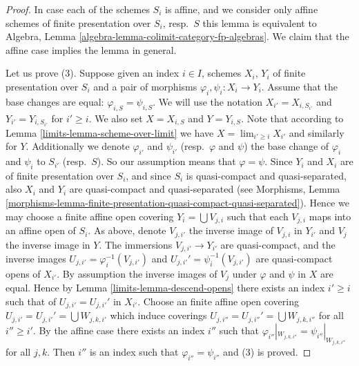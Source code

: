 \begin{proof}

In case each of the schemes $S_i$ is affine, and we consider
only affine schemes of finite presentation over $S_i$, resp.\ $S$
this lemma is equivalent to
Algebra, Lemma \ref{algebra-lemma-colimit-category-fp-algebras}.
We claim that the affine case implies the lemma in general.

\medskip\noindent
Let us prove (3). Suppose given an index $i \in I$, schemes
$X_i$, $Y_i$ of finite presentation over $S_i$ and a pair of morphisms
$\varphi_i, \psi_i : X_i \to Y_i$. Assume that the base changes are
equal: $\varphi_{i, S} = \psi_{i, S}$. We will use the notation
$X_{i'} = X_{i, S_{i'}}$ and $Y_{i'} = Y_{i, S_{i'}}$ for
$i' \geq i$. We also set $X = X_{i, S}$ and $Y = Y_{i, S}$.
Note that according to Lemma \ref{limits-lemma-scheme-over-limit} we have
$X = \lim_{i' \geq i} X_{i'}$ and similarly for $Y$.
Additionally we denote $\varphi_{i'}$ and $\psi_{i'}$
(resp.\ $\varphi$ and $\psi$)
the base change of $\varphi_i$ and $\psi_i$ to $S_{i'}$
(resp.\ $S$). So our assumption means that $\varphi = \psi$.
Since $Y_i$ and $X_i$ are of finite presentation
over $S_i$, and since $S_i$ is quasi-compact and quasi-separated, also
$X_i$ and $Y_i$ are quasi-compact and quasi-separated
(see Morphisms,
Lemma \ref{morphisms-lemma-finite-presentation-quasi-compact-quasi-separated}).
Hence we may choose a finite affine open covering
$Y_i = \bigcup V_{j, i}$ such that each $V_{j, i}$ maps into
an affine open of $S_i$. As above, denote $V_{j, i'}$ the inverse
image of $V_{j, i}$ in $Y_{i'}$ and $V_j$ the inverse image in $Y$.
The immersions $V_{j, i'} \to Y_{i'}$ are quasi-compact, and the inverse images
$U_{j, i'} = \varphi_i^{-1}(V_{j, i'})$ and
$U_{j, i'}' = \psi_i^{-1}(V_{j, i'})$
are quasi-compact opens of $X_{i'}$. By assumption the inverse images of
$V_j$ under $\varphi$ and $\psi$ in $X$ are equal.
Hence by Lemma \ref{limits-lemma-descend-opens}
there exists an index $i' \geq i$ such that
of $U_{j, i'} = U_{j, i'}'$ in $X_{i'}$.
Choose an finite affine open covering
$U_{j, i'} = U_{j, i'}' = \bigcup W_{j, k, i'}$
which induce coverings $U_{j, i''} = U_{j, i''}' = \bigcup W_{j, k, i''}$
for all $i'' \geq i'$.
By the affine case there exists
an index $i''$ such that
$\varphi_{i''}|_{W_{j, k, i''}} = \psi_{i''}|_{W_{j, k, i''}}$
for all $j, k$. Then $i''$ is an index such that
$\varphi_{i''} = \psi_{i''}$ and (3) is proved.


\end{proof}
